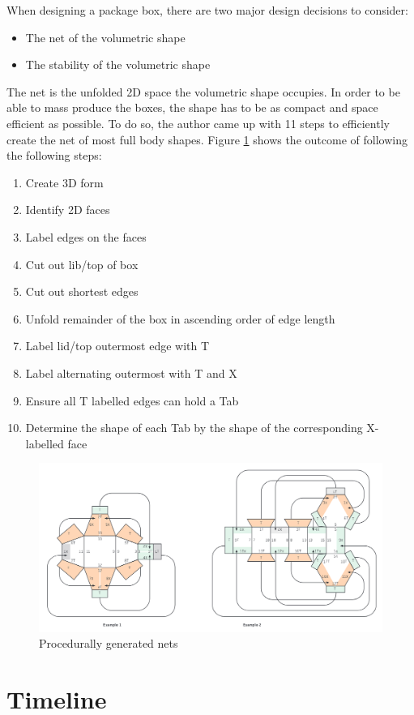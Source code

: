\documentclass[a4paper, fleqn]{article}
\begin{document}
When designing a package box, there are two major design decisions to consider:
\begin{itemize}
\item The net of the volumetric shape
\item The stability of the volumetric shape
\end{itemize}
The net is the unfolded 2D space the volumetric shape occupies. In order to be able to mass produce the boxes, the shape has to be as compact and space efficient as possible. To do so, the author came up with 11 steps to efficiently create the net of most full body shapes. Figure \ref{figure:nets} shows the outcome of following the following steps:
\begin{enumerate}[label=\textbf{Step \arabic*} ]
\item Create 3D form
\item Identify 2D faces
\item Label edges on the faces
\item Cut out lib/top of box
\item Cut out shortest edges
\item Unfold remainder of the box in ascending order of edge length
\item Label lid/top outermost edge with T
\item Label alternating outermost with T and X
\item Ensure all T labelled edges can hold a Tab
\item Determine the shape of each Tab by the shape of the corresponding X-labelled face
\end{enumerate}
\begin{figure}[h!]
\includegraphics[width=\linewidth]{./assets/201803260810.png}
\caption{Procedurally generated nets}
\label{figure:nets}
\end{figure}
\section{Timeline}
\end{document}
